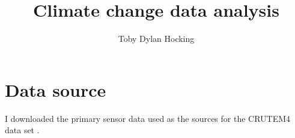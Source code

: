 \documentclass{article}
\begin{document}
\title{Climate change data analysis}

\author{Toby Dylan Hocking}

\maketitle

\section{Data source}

I downloaded the primary sensor data used as the sources for the
CRUTEM4 data set \citep{CRUTEM4}.




\end{document}

